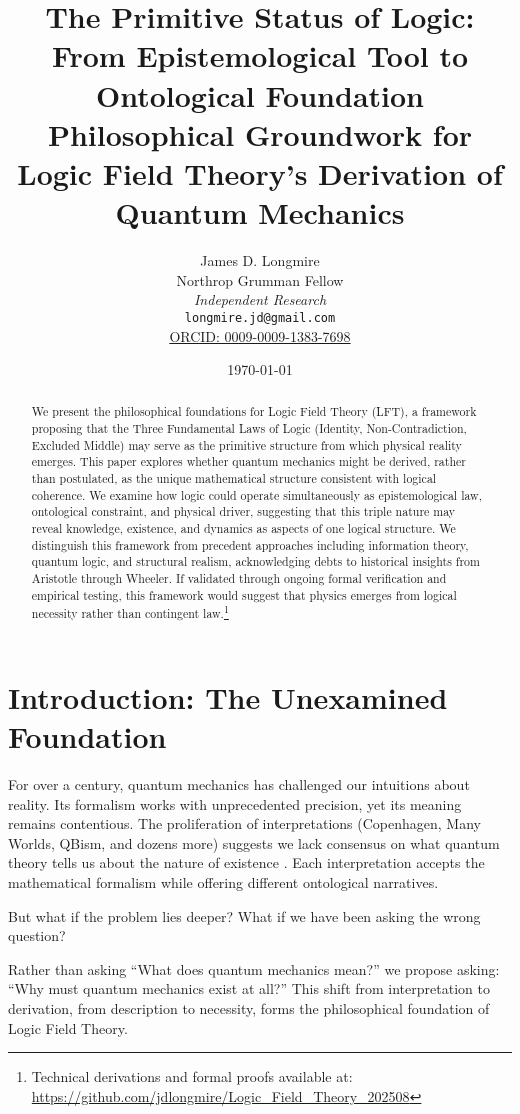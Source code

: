 \documentclass[12pt,a4paper]{article}
\title{\textbf{The Primitive Status of Logic: From Epistemological Tool to Ontological Foundation}\\[0.5em]
\large Philosophical Groundwork for Logic Field Theory's Derivation of Quantum Mechanics}
\author{James D. Longmire\\
Northrop Grumman Fellow\\
\textit{Independent Research}\\
\texttt{longmire.jd@gmail.com}\\
\href{https://orcid.org/0009-0009-1383-7698}{ORCID: 0009-0009-1383-7698}}
\date{\today}
\begin{document}
\maketitle

\begin{abstract}
We present the philosophical foundations for Logic Field Theory (LFT), a framework proposing that the Three Fundamental Laws of Logic (Identity, Non-Contradiction, Excluded Middle) may serve as the primitive structure from which physical reality emerges. This paper explores whether quantum mechanics might be derived, rather than postulated, as the unique mathematical structure consistent with logical coherence. We examine how logic could operate simultaneously as epistemological law, ontological constraint, and physical driver, suggesting that this triple nature may reveal knowledge, existence, and dynamics as aspects of one logical structure. We distinguish this framework from precedent approaches including information theory, quantum logic, and structural realism, acknowledging debts to historical insights from Aristotle through Wheeler. If validated through ongoing formal verification and empirical testing, this framework would suggest that physics emerges from logical necessity rather than contingent law.\footnote{Technical derivations and formal proofs available at: \url{https://github.com/jdlongmire/Logic_Field_Theory_202508}}
\end{abstract}

\section{Introduction: The Unexamined Foundation}

For over a century, quantum mechanics has challenged our intuitions about reality. Its formalism works with unprecedented precision, yet its meaning remains contentious. The proliferation of interpretations (Copenhagen, Many Worlds, QBism, and dozens more) suggests we lack consensus on what quantum theory tells us about the nature of existence \citep{maudlin2019philosophy}. Each interpretation accepts the mathematical formalism while offering different ontological narratives.

But what if the problem lies deeper? What if we have been asking the wrong question?

Rather than asking ``What does quantum mechanics mean?'' we propose asking: ``Why must quantum mechanics exist at all?'' This shift from interpretation to derivation, from description to necessity, forms the philosophical foundation of Logic Field Theory.
\end{document}
